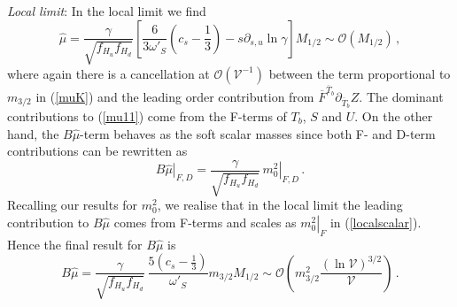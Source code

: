 \documentclass[11pt,a4paper]{article}
\newcommand{\be}{\begin{equation}}
\newcommand{\ee}{\end{equation}}
\newcommand\vo{{\mathcal{V}}}
\newcommand{\mc}{\mathcal}
\begin{document}
\medskip
\emph{Local limit}: In the local limit we find
\be
\hat\mu  =  \frac{\gamma}{\sqrt{f_{H_u } f_{H_d}}} \left[\frac{6}{3 \omega'_S} \left(c_s-\frac 13\right)
- s \partial_{s,u} \ln\gamma \right] M_{1/2}\sim\mc{O}\left(M_{1/2}\right)\,,
\label{mu11}
\ee
where again there is a cancellation at $\mc{O}(\vo^{-1})$ between the term proportional to $m_{3/2}$ in (\ref{muK})
and the leading order contribution from $\overline{F}^{\overline{T}_b}\partial_{\overline{T}_b}Z$.
The dominant contributions to (\ref{mu11}) come from the F-terms of $T_b$, $S$ and $U$.
On the other hand, the $B\hat\mu$-term behaves as the soft scalar masses since both F- and D-term contributions can be rewritten as
\be
\left.B\hat{\mu}\right|_{F,D} = \frac{\gamma}{\sqrt{f_{H_u} f_{H_d}}}\, \left.m_0^2\right|_{F,D}\,.
\label{bmu11}
\ee
Recalling our results for $m_0^2$, we realise that in the local limit the leading contribution to $B\hat\mu$ comes from F-terms
and scales as $\left.m_0^2\right|_F$ in (\ref{localscalar}). Hence the final result for $B\hat\mu$ is
\be
B\hat{\mu} = \frac{\gamma}{\sqrt{f_{H_u} f_{H_d}}}\, \frac{5\left(c_s-\frac 13\right)}{\omega'_S} m_{3/2}M_{1/2}\sim \mc{O}\left(m_{3/2}^2\frac{\left(\ln\vo\right)^{3/2}}{\vo}\right)\,.
\label{bmu11local}
\ee
\end{document}
